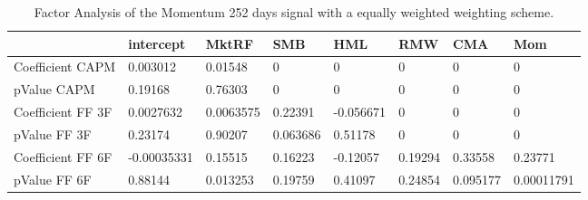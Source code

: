 \begin{table}[H]
\centering
\begin{tabular}{llllllll}
& intercept & MktRF & SMB & HML & RMW & CMA & Mom \\ 
\hline 
Coefficient CAPM & 0.003012 & 0.01548 & 0 & 0 & 0 & 0 & 0 \\ 
pValue CAPM & 0.19168 & 0.76303 & 0 & 0 & 0 & 0 & 0 \\ 
Coefficient FF 3F & 0.0027632 & 0.0063575 & 0.22391 & -0.056671 & 0 & 0 & 0 \\ 
pValue FF 3F & 0.23174 & 0.90207 & 0.063686 & 0.51178 & 0 & 0 & 0 \\ 
Coefficient FF 6F & -0.00035331 & 0.15515 & 0.16223 & -0.12057 & 0.19294 & 0.33558 & 0.23771 \\ 
pValue FF 6F & 0.88144 & 0.013253 & 0.19759 & 0.41097 & 0.24854 & 0.095177 & 0.00011791 \\ 
\hline
\end{tabular}
\caption{Factor Analysis of the Momentum 252 days signal with a equally weighted weighting scheme.}
\label{MOM252EW_FACTOR}
\end{table}